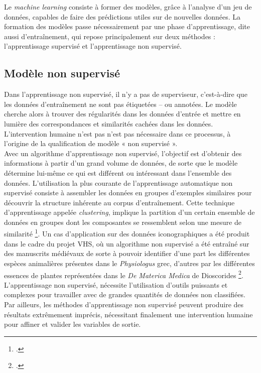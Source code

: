 \documentclass[12pt,twoside]{book}
\begin{document}
Le \textit{machine learning} consiste à former des modèles, grâce à l’analyse d’un jeu de données, capables de faire des prédictions utiles sur de nouvelles données. La formation des modèles passe nécessairement par une phase d’apprentissage, dite aussi d’entraînement, qui repose principalement sur deux méthodes : l'apprentissage supervisé et l'apprentissage non supervisé.

\subsection{Modèle non supervisé}

Dans l'apprentissage non supervisé, il n'y a pas de superviseur, c’est-à-dire que les données d’entraînement ne sont pas étiquetées – ou annotées. Le modèle cherche alors à trouver des régularités dans les données d'entrée et mettre en lumière des correspondances et similarités cachées dans les données. L’intervention humaine n’est pas n’est pas nécessaire dans ce processus, à l’origine de la qualification de modèle « non supervisé ». \\

Avec un algorithme d'apprentissage non supervisé, l'objectif est d'obtenir des informations à partir d’un grand volume de données, de sorte que le modèle détermine lui-même ce qui est différent ou intéressant dans l'ensemble des données. L'utilisation la plus courante de l'apprentissage automatique non supervisé consiste à assembler les données en groupes d'exemples similaires pour découvrir la structure inhérente au corpus d’entraînement. Cette technique d’apprentissage appelée \textit{clustering}, implique la partition d'un certain ensemble de données en groupes dont les composantes se ressemblent selon une mesure de similarité \footcite{alpaydin_introduction_2014}. Un cas d’application sur des données iconographiques a été produit dans le cadre du projet VHS, où un algorithme non supervisé a été entraîné sur des manuscrits médiévaux de sorte à pouvoir identifier d’une part les différentes espèces animalières présentes dans le \textit{Physiologus} grec, d’autres par les différentes essences de plantes représentées dans le \textit{De Materica Medica} de Dioscorides \footcite{kaoua_image_2021}. \\

L’apprentissage non supervisé, nécessite l’utilisation d'outils puissants et complexes pour travailler avec de grandes quantités de données non classifiées. Par ailleurs, les méthodes d'apprentissage non supervisé peuvent produire des résultats extrêmement imprécis, nécessitant finalement une intervention humaine pour affiner et valider les variables de sortie.
\end{document}
